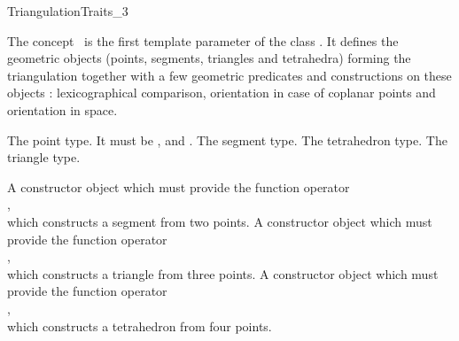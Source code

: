 

\begin{ccRefConcept}{TriangulationTraits_3}

\ccDefinition
The concept \ccRefName\ is the first template parameter of the class
. It defines the geometric objects (points, segments,
triangles and tetrahedra) forming the triangulation together with a few
geometric predicates and constructions on these objects : lexicographical
comparison, orientation in case of coplanar points and orientation in space.

\ccTypes
{}

{The point type.  It must be ,
 and .}
\ccGlue
{} {The segment type.}
\ccGlue
{} {The tetrahedron type.}
\ccGlue
{} {The triangle type.}


{A constructor object which must provide the function operator\\
,\\
which constructs a segment from two points.}
\ccGlue
{}
{A constructor object which must provide the function operator\\
,\\
which constructs a triangle from three points.}
\ccGlue
{}
{A constructor object which must provide the function operator\\
,\\
which constructs a tetrahedron from four points.}


\end{ccRefConcept}
